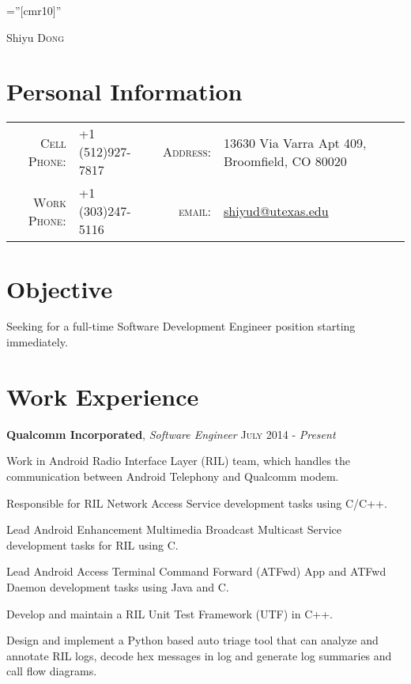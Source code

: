 \documentclass[a4paper,11pt]{article}
\begin{document}
\pagestyle{empty} %

\font\fb=''[cmr10]'' %

\par{\centering
		{\huge Shiyu \textsc{Dong}}
    \bigskip\par}

\vspace{-0.05 in} \section{Personal Information}
\begin{tabular}{rp{3.4cm}rl}
    \textsc{Cell Phone:} & +1 (512)927-7817 & \textsc{Address:} & 13630 Via Varra Apt 409, Broomfield, CO 80020\\
    \textsc{Work Phone:} & +1 (303)247-5116 & \textsc{email:}   & \href{mailto:shiyud@utexas.edu}{shiyud@utexas.edu}
\end{tabular}

\section{Objective}
Seeking for a full-time Software Development Engineer position starting immediately.

\section{Work Experience}

\textbf{Qualcomm Incorporated}, \emph{Software Engineer} \hfill \textsc{July 2014} - \emph{Present}\vspace{-10pt}\\
\begin{itemize}[noitemsep,topsep=0pt,parsep=0pt,partopsep=0pt,leftmargin=*]\vspace{-5pt}
\small{
  \item Work in Android Radio Interface Layer (RIL) team, which handles the communication between Android Telephony and Qualcomm modem.
  \item Responsible for RIL Network Access Service development tasks using C/C++.
  \item Lead Android Enhancement Multimedia Broadcast Multicast Service development tasks for RIL using C.
  \item Lead Android Access Terminal Command Forward (ATFwd) App and ATFwd Daemon development tasks using Java and C.
  \item Develop and maintain a RIL Unit Test Framework (UTF) in C++.
  \item Design and implement a Python based auto triage tool that can analyze and annotate RIL logs, decode hex messages in log and generate log summaries and call flow diagrams.
}
\end{itemize}
\end{document}
